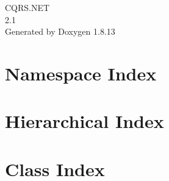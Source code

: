 \documentclass[twoside]{book}
\newcommand{\+}{\discretionary{\mbox{\scriptsize$\hookleftarrow$}}{}{}}
\newcommand{\clearemptydoublepage}{%
  \newpage{\pagestyle{empty}\cleardoublepage}%
}
\begin{document}
\hypersetup{pageanchor=false,
             bookmarksnumbered=true,
             pdfencoding=unicode
            }
\begin{titlepage}
\vspace*{7cm}
\begin{center}%
{\Large C\+Q\+R\+S.\+N\+ET \\[1ex]\large 2.\+1 }\\
\vspace*{1cm}
{\large Generated by Doxygen 1.8.13}\\
\end{center}
\end{titlepage}
\clearemptydoublepage
{}
\tableofcontents
\clearemptydoublepage
{}
\hypersetup{pageanchor=true}

\chapter{Namespace Index}

\chapter{Hierarchical Index}

\chapter{Class Index}

\end{document}
